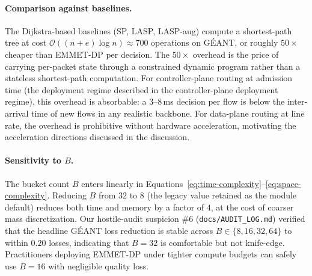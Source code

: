 \paragraph{Comparison against baselines.}
The Dijkstra-based baselines (SP, LASP, LASP-aug) compute a
shortest-path tree at cost
$\mathcal{O}((n + e)\log n) \approx 700$ operations on GÉANT, or
roughly $50\times$ cheaper than EMMET-DP per decision. The
$50\times$ overhead is the price of carrying per-packet state
through a constrained dynamic program rather than a stateless
shortest-path computation. For controller-plane routing at
admission time (the deployment regime described in
the controller-plane deployment regime), this overhead is
absorbable: a $3$--$8$\,ms decision per flow is below the
inter-arrival time of new flows in any realistic backbone.
For data-plane routing at line rate, the overhead is
prohibitive without hardware acceleration, motivating the
acceleration directions discussed in the discussion.

\paragraph{Sensitivity to $B$.}
The bucket count $B$ enters linearly in
Equations~\ref{eq:time-complexity}--\ref{eq:space-complexity}.
Reducing $B$ from $32$ to $8$ (the legacy value retained as the
module default) reduces both time and memory by a factor of $4$,
at the cost of coarser mass discretization. Our hostile-audit
suspicion \#6 (\texttt{docs/AUDIT\_LOG.md})
verified that the headline GÉANT loss reduction is stable across
$B \in \{8, 16, 32, 64\}$ to within $0.20$ losses, indicating
that $B = 32$ is comfortable but not knife-edge. Practitioners
deploying EMMET-DP under tighter compute budgets can safely use
$B = 16$ with negligible quality loss.
